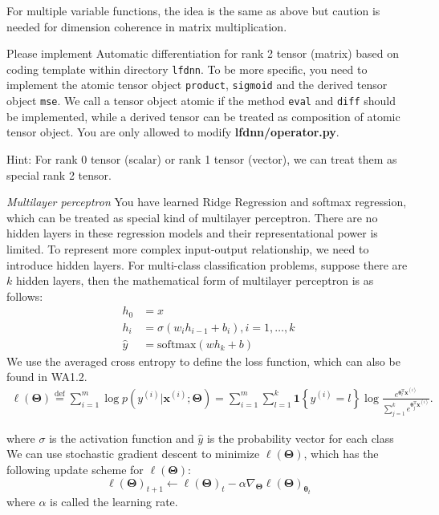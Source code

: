 \documentclass[a4paper, 12pt]{exam}
\newcommand{\bTheta}{\bm{\Theta}}
\newcommand*{\defeq}{\stackrel{\text{def}}{=}}
\begin{document}
\begin{questions}
		For multiple variable functions, the idea is the same as above but caution is needed for dimension coherence in matrix multiplication.
		
		Please implement Automatic differentiation for rank 2 tensor (matrix) based on coding template within directory \texttt{lfdnn}. To be more specific, you need to implement
		the atomic tensor object \texttt{product}, \texttt{sigmoid} and the derived tensor object \texttt{mse}. We call a tensor object
		atomic if the method \texttt{eval} and \texttt{diff} should be implemented, while a derived tensor can be treated as composition of
		atomic tensor object. You are only allowed to modify \textbf{lfdnn/operator.py}.
		
		Hint: For rank 0 tensor (scalar) or rank 1 tensor (vector), we can treat
		them as special rank 2 tensor.
		
		\question \emph{Multilayer perceptron} You have learned Ridge Regression and softmax regression, which can be treated
		as special kind of multilayer perceptron. There are no hidden layers in these regression models and their representational power is limited.
		To represent more complex input-output relationship, we need to introduce hidden layers. For multi-class classification problems, suppose there are $k$ hidden layers,
		then the mathematical form of multilayer perceptron is as follows:
		\begin{align*}
		h_0 &= x \\
		h_i &= \sigma(w_i h_{i-1} + b_i), i = 1, \dots, k \\
		\hat{y} &= \textrm{softmax}(w h_k + b)
		\end{align*}
		We use the averaged cross entropy to define the loss function, which can also be found in WA1.2.
		\begin{align*}
		\ell(\bTheta)
		\defeq \sum_{i=1}^{m} \log p(y^{(i)}|\bm{x}^{(i)};\bTheta) = \sum_{i=1}^{m}\sum_{l=1}^{k} \bm{1}\left\{ y^{(i)} = l\right\} \log \frac{e^{\bm{\theta}_l^{\mathrm{T}}\bm{x}^{(i)}}}{\sum_{j=1}^k e^{\bm{\theta}_j^{\mathrm{T}}\bm{x}^{(i)}}}.
		\end{align*}
		
		where $\sigma$ is the activation function and $\hat{y}$ is the probability vector for each class
		We can use stochastic gradient descent to minimize $\ell(\bTheta)$, which has the following update scheme for $\ell(\bTheta)$:
		\begin{equation*}
		\ell(\bTheta)_{t+1} \leftarrow \ell(\bTheta)_t - \alpha \nabla_{\bm{\Theta}} \ell(\bTheta)_{\bm{\theta}_t}
		\end{equation*}
		where $\alpha$ is called the learning rate.
		

\end{questions}
\end{document}
